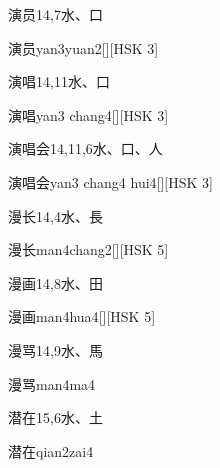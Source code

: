 \begin{entry}{演员}{14,7}{⽔、⼝}
  \begin{phonetics}{演员}{yan3yuan2}[][HSK 3]
  \end{phonetics}
\end{entry}

\begin{entry}{演唱}{14,11}{⽔、⼝}
  \begin{phonetics}{演唱}{yan3 chang4}[][HSK 3]
  \end{phonetics}
\end{entry}

\begin{entry}{演唱会}{14,11,6}{⽔、⼝、⼈}
  \begin{phonetics}{演唱会}{yan3 chang4 hui4}[][HSK 3]
  \end{phonetics}
\end{entry}

\begin{entry}{漫长}{14,4}{⽔、⾧}
  \begin{phonetics}{漫长}{man4chang2}[][HSK 5]
  \end{phonetics}
\end{entry}

\begin{entry}{漫画}{14,8}{⽔、⽥}
  \begin{phonetics}{漫画}{man4hua4}[][HSK 5]
  \end{phonetics}
\end{entry}

\begin{entry}{漫骂}{14,9}{⽔、⾺}
  \begin{phonetics}{漫骂}{man4ma4}
  \end{phonetics}
\end{entry}

\begin{entry}{潜在}{15,6}{⽔、⼟}
  \begin{phonetics}{潜在}{qian2zai4}
  \end{phonetics}
\end{entry}

